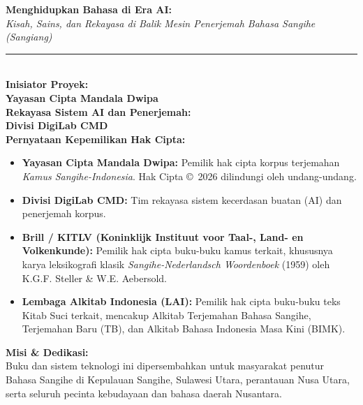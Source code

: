 \documentclass[11pt,twoside,openright]{book}
\begin{document}
\newpage
\thispagestyle{empty}
\vspace*{\fill}
\begin{flushleft}
    \small\sffamily
    \textbf{Menghidupkan Bahasa di Era AI:}\\
    \textit{Kisah, Sains, dan Rekayasa di Balik Mesin Penerjemah Bahasa Sangihe (Sangiang)}\\[0.8em]
    \rule{\textwidth}{0.6pt}\\[0.8em]
    
    \textbf{Inisiator Proyek:}\\
    \textbf{Yayasan Cipta Mandala Dwipa}\\[0.8em]
    
    \textbf{Rekayasa Sistem AI dan Penerjemah:}\\
    \textbf{Divisi DigiLab CMD}\\[0.8em]
    
    \textbf{Pernyataan Kepemilikan Hak Cipta:}\\
    \begin{itemize}[leftmargin=1.2em, itemsep=0.35em]
        \item \textbf{Yayasan Cipta Mandala Dwipa:} Pemilik hak cipta korpus terjemahan \textit{Kamus Sangihe-Indonesia}. Hak Cipta \copyright\ 2026 dilindungi oleh undang-undang.
        \item \textbf{Divisi DigiLab CMD:} Tim rekayasa sistem kecerdasan buatan (AI) dan penerjemah korpus.
        \item \textbf{Brill / KITLV (Koninklijk Instituut voor Taal-, Land- en Volkenkunde):} Pemilik hak cipta buku-buku kamus terkait, khususnya karya leksikografi klasik \textit{Sangihe-Nederlandsch Woordenboek} (1959) oleh K.G.F. Steller \& W.E. Aebersold.
        \item \textbf{Lembaga Alkitab Indonesia (LAI):} Pemilik hak cipta buku-buku teks Kitab Suci terkait, mencakup Alkitab Terjemahan Bahasa Sangihe, Terjemahan Baru (TB), dan Alkitab Bahasa Indonesia Masa Kini (BIMK).
    \end{itemize}
    \vspace{0.6em}
    
    \textbf{Misi \& Dedikasi:}\\
    Buku dan sistem teknologi ini dipersembahkan untuk masyarakat penutur Bahasa Sangihe di Kepulauan Sangihe, Sulawesi Utara, perantauan Nusa Utara, serta seluruh pecinta kebudayaan dan bahasa daerah Nusantara.\\[0.8em]
    

\end{flushleft}
\end{document}
